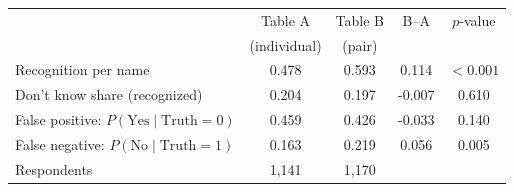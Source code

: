 \begin{tabular}{lcccc}
\toprule
 & Table A & Table B & B--A & $p$-value\\
 & (individual) & (pair) & & \\
\midrule
Recognition per name & 0.478 & 0.593 & 0.114 & $<0.001$\\
Don't know share (recognized) & 0.204 & 0.197 & -0.007 & 0.610\\
False positive: $P(\text{Yes}\mid\text{Truth}=0)$ & 0.459 & 0.426 & -0.033 & 0.140\\
False negative: $P(\text{No}\mid\text{Truth}=1)$ & 0.163 & 0.219 & 0.056 & 0.005\\
\midrule
Respondents & 1,141 & 1,170 & & \\
\bottomrule
\end{tabular}
